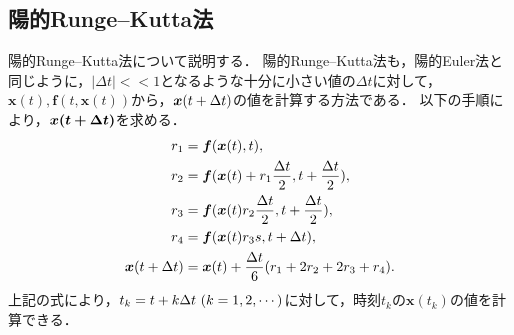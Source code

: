 \subsection{陽的Runge--Kutta法}
陽的Runge--Kutta法について説明する．
陽的Runge--Kutta法も，陽的Euler法と同じように，$|\Delta t| << 1 $となるような十分に小さい値の$\Delta t$に対して，$\bm{x}(t),\bm{f}(t,\bm{x}(t))$から，$\bm{x}(t + \Delta t )$の値を計算する方法である．
以下の手順により，$\bm{x(t + \Delta t)}$を求める．
\begin{align}
    r_1 &= \bm{f}(\bm{x}(t),t), \\
    r_2 &= \bm{f}(\bm{x}(t)+r_1 \frac{\Delta t}{2},t + \frac{\Delta t}{2}), \\
    r_3 &= \bm{f}(\bm{x}(t)r_2 \frac{\Delta t}{2}, t + \frac{\Delta t}{2}), \\
    r_4 &= \bm{f}(\bm{x}(t)r_3 s, t + \Delta t), \\
    \bm{x}(t + \Delta t) &= \bm{x}(t) + \frac{\Delta t}{6}(r_1 + 2r_2 + 2r_3 + r_4).
\end{align}
上記の式により，$t_k = t + k\Delta t \ (k = 1,2,\cdots)$に対して，時刻$t_k$の$\bm{x}(t_k)$の値を計算できる．


